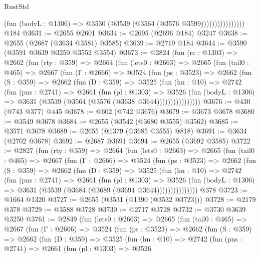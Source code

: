\begin{lexlean}{RustStd}
\begin{coremodule}
                            (fun (bodyL : @1306) => @3530 (@3539 (@3564 (@3576 @3599))))))))))))))))
    @184
@3631 := @2655 @2601
@3634 := @2695 (@2696 @184) @3247
@3638 := @2655 (@2687 (@3634 @3581) @3585)
@3639 := @2719 @184
@3644 := @3590 (@3591 @3639 @3250 @3552 @3554)
@3673 := @2824
    (fun (rc : @1303) =>
    @2662
      (fun (rty : @359) =>
      @2664
        (fun (lets0 : @2663) =>
        @2665
          (fun (tail0 : @465) =>
          @2667
            (fun (Γ : @2666) =>
            @3524
              (fun (ps : @3523) =>
              @2662
                (fun (S : @359) =>
                @2662
                  (fun (D : @359) =>
                  @3525
                    (fun (hn : @10) =>
                    @2742
                      (fun (pns : @2741) =>
                      @2661
                        (fun (pl : @1303) =>
                        @3526
                          (fun (bodyL : @1306) =>
                          @3631 (@3539 (@3564 (@3576 (@3638 @3644))))))))))))))))
@3676 := @430 (@743 @377) @445
@3678 := @602 (@742 @3676)
@3679 := @3673 @3678
@3680 := @3549 @3678
@3684 := @2655 (@3542 (@3680 @3555) @3562)
@3685 := @3571 @3678
@3689 := @2655 (@1379 (@3685 @3555) @818)
@3691 := @3634 (@2702 @3678)
@3692 := @2687 @3691
@3694 := @2655 (@3692 @3585)
@3722 := @2827
    (fun (rty : @359) =>
    @2664
      (fun (lets0 : @2663) =>
      @2665
        (fun (tail0 : @465) =>
        @2667
          (fun (Γ : @2666) =>
          @3524
            (fun (ps : @3523) =>
            @2662
              (fun (S : @359) =>
              @2662
                (fun (D : @359) =>
                @3525
                  (fun (hn : @10) =>
                  @2742
                    (fun (pns : @2741) =>
                    @2661
                      (fun (pl : @1303) =>
                      @3526
                        (fun (bodyL : @1306) =>
                        @3631 (@3539 (@3684 (@3689 (@3694 @3644)))))))))))))))
    @378
@3723 := @1664 @1320
@3727 := @2655 (@3531 (@1390 (@3532 @3723)))
@3728 := @2179 @378
@3729 := @3588 @3728
@3730 := @2717 @3728
@3732 := @3730 @3639 @3250
@3761 := @2849
    (fun (lets0 : @2663) =>
    @2665
      (fun (tail0 : @465) =>
      @2667
        (fun (Γ : @2666) =>
        @3524
          (fun (ps : @3523) =>
          @2662
            (fun (S : @359) =>
            @2662
              (fun (D : @359) =>
              @3525
                (fun (hn : @10) =>
                @2742
                  (fun (pns : @2741) =>
                  @2661
                    (fun (pl : @1303) =>
                    @3526

\end{coremodule}
\end{lexlean}
